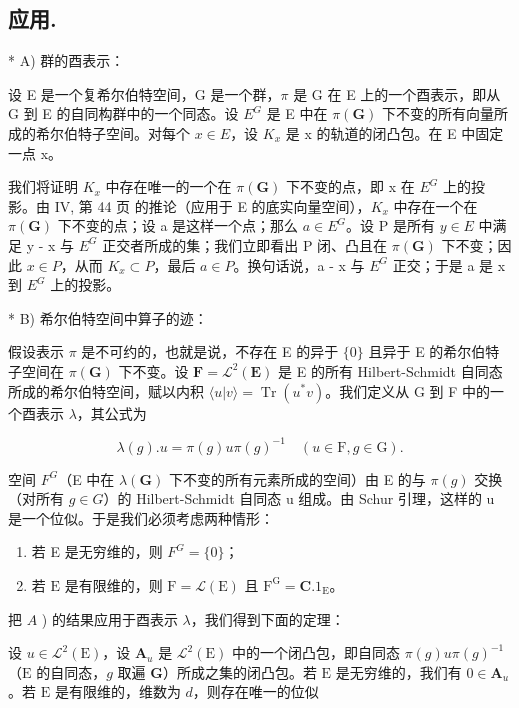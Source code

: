 \subsection{应用.}

* A) 群的酉表示：

设 E 是一个复希尔伯特空间，G 是一个群，\(\pi\) 是 G 在 E 上的一个酉表示，即从 G 到 E 的自同构群中的一个同态。设 \(E^{G}\) 是 E 中在 \(\pi(\mathbf{G})\) 下不变的所有向量所成的希尔伯特子空间。对每个 \(x \in E\)，设 \(K_{x}\) 是 x 的轨道的闭凸包。在 E 中固定一点 x。

我们将证明 \(K_{x}\) 中存在唯一的一个在 \(\pi(\mathbf{G})\) 下不变的点，即 x 在 \(E^{G}\) 上的投影。由 IV, 第 44 页 的推论（应用于 E 的底实向量空间），\(K_{x}\) 中存在一个在 \(\pi(\mathbf{G})\) 下不变的点；设 a 是这样一个点；那么 \(a \in E^{G}\)。设 P 是所有 \(y \in E\) 中满足 y - x 与 \(E^{G}\) 正交者所成的集；我们立即看出 P 闭、凸且在 \(\pi(\mathbf{G})\) 下不变；因此 \(x \in P\)，从而 \(K_{x} \subset P\)，最后 \(a \in P\)。换句话说，a - x 与 \(E^{G}\) 正交；于是 a 是 x 到 \(E^{G}\) 上的投影。

* B) 希尔伯特空间中算子的迹：

假设表示 \(\pi\) 是不可约的，也就是说，不存在 E 的异于 \(\{0\}\) 且异于 E 的希尔伯特子空间在 \(\pi(\mathbf{G})\) 下不变。设 \(\mathbf{F} = \mathcal{L}^{2}(\mathbf{E})\) 是 E 的所有 Hilbert-Schmidt 自同态所成的希尔伯特空间，赋以内积 \(\langle u|v\rangle = \operatorname{Tr}(u^{*}v)\)。我们定义从 G 到 F 中的一个酉表示 \(\lambda\)，其公式为

\[
\lambda (g). u = \pi (g) u \pi (g) ^ {- 1} \quad (u \in \mathrm{F}, g \in \mathrm{G}).\tag{3}
\]

空间 \(F^{G}\)（E 中在 \(\lambda(\mathbf{G})\) 下不变的所有元素所成的空间）由 E 的与 \(\pi(g)\) 交换（对所有 \(g \in G\)）的 Hilbert-Schmidt 自同态 u 组成。由 Schur 引理，这样的 u 是一个位似。于是我们必须考虑两种情形：

\begin{enumerate}
\def\labelenumi{\arabic{enumi})}
\item
  若 E 是无穷维的，则 \(F^{G} = \{0\}\)；
\item
  若 \(\mathrm{E}\) 是有限维的，则 \(\mathrm{F} = \mathcal{L}(\mathrm{E})\) 且 \(\mathrm{F}^{\mathrm{G}} = \mathbf{C}.1_{\mathrm{E}}\)。
\end{enumerate}

把 \(A\) ) 的结果应用于酉表示 \(\lambda\)，我们得到下面的定理：

设 \(u \in \mathcal{L}^2(\mathrm{E})\)，设 \(\mathbf{A}_u\) 是 \(\mathcal{L}^2(\mathrm{E})\) 中的一个闭凸包，即自同态 \(\pi(g) u\pi(g)^{-1}\)（\(\mathrm{E}\) 的自同态，\(g\) 取遍 \(\mathbf{G}\)）所成之集的闭凸包。若 \(\mathrm{E}\) 是无穷维的，我们有 \(0 \in \mathbf{A}_u\)。若 \(\mathrm{E}\) 是有限维的，维数为 \(d\)，则存在唯一的位似

